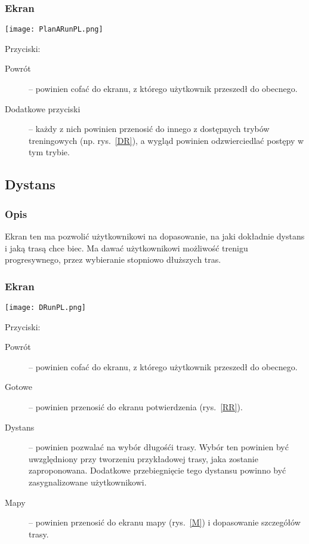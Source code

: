 \subsubsection{Ekran}
\begin{minipage}{0.5\textwidth}
  \label{PR}
  \texttt{[image: PlanARunPL.png]}
\end{minipage}
\begin{minipage}{0.5\textwidth}
Przyciski:\\
\begin{description}
  \item[Powrót] -- powinien cofać do ekranu, z którego użytkownik przeszedł do obecnego.
  \item[Dodatkowe przyciski] -- każdy z nich powinien przenosić do innego z dostępnych trybów treningowych (np. rys.~\ref{DR}), a wygląd powinien odzwierciedlać postępy w tym trybie.
\end{description}
\end{minipage}
\subsection{Dystans}
\subsubsection{Opis}
\noindent Ekran ten ma pozwolić użytkownikowi na dopasowanie, na jaki dokładnie dystans i jaką trasą chce biec. Ma dawać użytkownikowi możliwość trenigu progresywnego, przez wybieranie stopniowo dłuższych tras.
\subsubsection{Ekran}
\begin{minipage}{0.5\textwidth}
  \label{DR}
  \texttt{[image: DRunPL.png]}
\end{minipage}
\begin{minipage}{0.5\textwidth}
Przyciski:\\
\begin{description}
  \item[Powrót] -- powinien cofać do ekranu, z którego użytkownik przeszedł do obecnego.
  \item[Gotowe] -- powinien przenosić do ekranu potwierdzenia (rys.~\ref{RR}).
  \item[Dystans] -- powinien pozwalać na wybór długośći trasy. Wybór ten powinien być uwzględniony przy tworzeniu przykładowej trasy, jaka zostanie zaproponowana. Dodatkowe przebiegnięcie tego dystansu powinno być zasygnalizowane użytkownikowi.
  \item[Mapy] -- powinien przenosić do ekranu mapy (rys.~\ref{M}) i dopasowanie szczegółów trasy.
\end{description}
\end{minipage}
